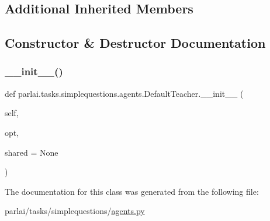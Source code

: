 \subsection*{Additional Inherited Members}


\subsection{Constructor \& Destructor Documentation}
\mbox{\label{classparlai_1_1tasks_1_1simplequestions_1_1agents_1_1DefaultTeacher_a94f826fb0eec41783ccfdab6ba77c0d1}} 
\subsubsection{\texorpdfstring{\+\_\+\+\_\+init\+\_\+\+\_\+()}{\_\_init\_\_()}}
{\footnotesize\ttfamily def parlai.\+tasks.\+simplequestions.\+agents.\+Default\+Teacher.\+\_\+\+\_\+init\+\_\+\+\_\+ (\begin{DoxyParamCaption}\item[{}]{self,  }\item[{}]{opt,  }\item[{}]{shared = {\ttfamily None} }\end{DoxyParamCaption})}



The documentation for this class was generated from the following file\+:\begin{DoxyCompactItemize}
\item 
parlai/tasks/simplequestions/\hyperlink{parlai_2tasks_2simplequestions_2agents_8py}{agents.\+py}\end{DoxyCompactItemize}

